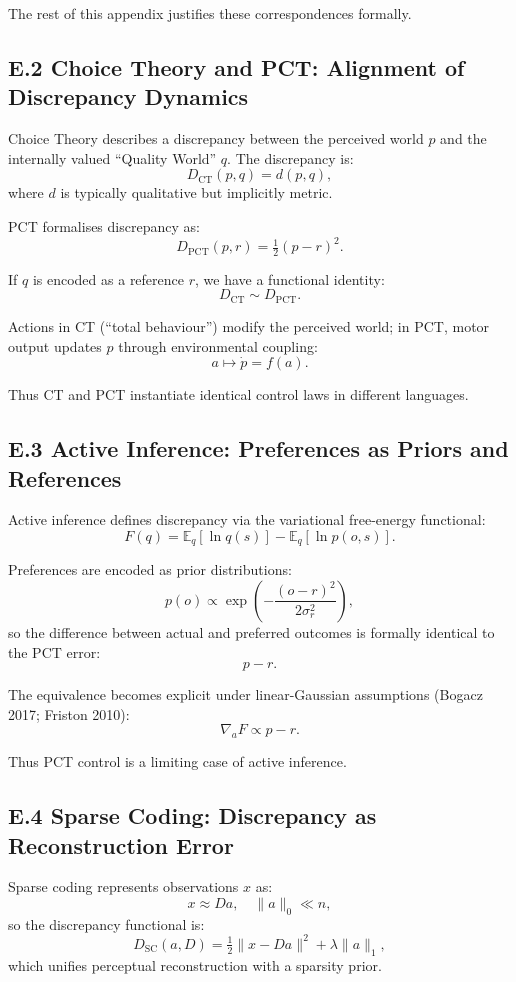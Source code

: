 \documentclass[11pt,a4paper,twoside]{article}
\begin{document}
The rest of this appendix justifies these correspondences formally.

\subsection*{E.2 Choice Theory and PCT: Alignment of Discrepancy Dynamics}

Choice Theory describes a discrepancy between the perceived world $p$ and the internally valued “Quality World” $q$. The discrepancy is:
\[
D_{\mathrm{CT}}(p,q) = d(p,q),
\]
where $d$ is typically qualitative but implicitly metric.

PCT formalises discrepancy as:
\[
D_{\mathrm{PCT}}(p,r) = \tfrac12 (p-r)^2.
\]

If $q$ is encoded as a reference $r$, we have a functional identity:
\[
D_{\mathrm{CT}} \sim D_{\mathrm{PCT}}.
\]

Actions in CT (“total behaviour”) modify the perceived world; in PCT, motor output updates $p$ through environmental coupling:
\[
a \mapsto \dot{p} = f(a).
\]

Thus CT and PCT instantiate identical control laws in different languages.

\subsection*{E.3 Active Inference: Preferences as Priors and References}

Active inference defines discrepancy via the variational free-energy functional:
\[
F(q) = \mathbb{E}_q[\ln q(s)] - \mathbb{E}_q[\ln p(o,s)].
\]

Preferences are encoded as prior distributions:
\[
p(o) \propto \exp\! \left(-\frac{(o-r)^2}{2\sigma_r^2}\right),
\]
so the difference between actual and preferred outcomes is formally identical to the PCT error:
\[
p - r.
\]

The equivalence becomes explicit under linear-Gaussian assumptions (Bogacz 2017; Friston 2010):
\[
\nabla_a F \propto p-r.
\]

Thus PCT control is a limiting case of active inference.

\subsection*{E.4 Sparse Coding: Discrepancy as Reconstruction Error}

Sparse coding represents observations $x$ as:
\[
x \approx Da, \quad \|a\|_0 \ll n,
\]
so the discrepancy functional is:
\[
D_{\mathrm{SC}}(a,D) = \tfrac12 \|x - Da\|^2 + \lambda \|a\|_1,
\]
which unifies perceptual reconstruction with a sparsity prior.
\end{document}
